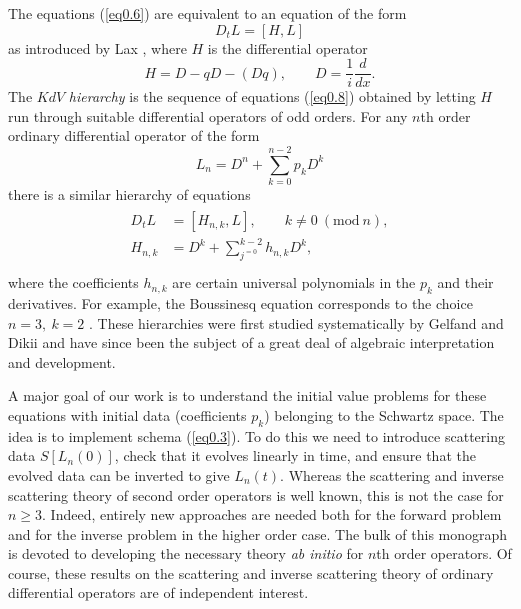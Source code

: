 \documentclass{surv-l}
\theoremstyle{plain}
\theoremstyle{definition}
\numberwithin{equation}{chapter}
\begin{document}
The equations (\ref{eq0.6}) are equivalent to an equation of the form
\begin{equation}\label{eq0.8}
D_{t}L=[H, L]
\end{equation}
as introduced by Lax \cite{Lx}, where $H$ is the differential operator
\begin{equation*}
H=D-qD-(Dq),\qquad D=\frac{1}{i}\frac{d}{dx}.
\end{equation*}
The $KdV$ \emph{hierarchy} is the sequence of equations (\ref{eq0.8}) obtained by letting $H$ run through suitable differential operators of odd orders. For any $n$th order ordinary differential operator of the form
\begin{equation*}
L_{n}=D^{n}+\sum_{k=0}^{n-2}p_{k}D^{k}
\end{equation*}
there is a similar hierarchy of equations
\begin{align}\label{eq0.9}
\begin{array}{ll}
D_{t}L &=  [H_{n,k},L],\qquad k\neq 0\ (\mathrm{mod}\ n),\\
H_{n,k} &=  D^{k}+\sum_{j^{=0}}^{k-2}h_{n,k}D^{k},\\\nonumber
\end{array}
\end{align}
where the coefficients $h_{n, k}$ are certain universal polynomials in the $p_{k}$ and their derivatives. For example, the Boussinesq equation corresponds to the choice $n = 3,\ k=2$ \cite{Za, McK, DTT}. These hierarchies were first studied systematically by Gelfand and Dikii \cite{GD} and have since been the subject of a great deal of algebraic interpretation and development.

A major goal of our work is to understand the initial value problems for these equations with initial data (coefficients $p_{k}$) belonging to the Schwartz space. The idea is to implement schema (\ref{eq0.3}). To do this we need to introduce scattering data $S[L_{n}(0)]$, check that it evolves linearly in time, and ensure that the evolved data can be inverted to give $L_{n}(t)$. Whereas the scattering and inverse scattering theory of second order operators is well known, this is not the case for $n\geq 3$. Indeed, entirely new approaches are needed both for the forward problem and for the inverse problem in the higher order case. The bulk of this monograph is devoted to developing the necessary theory \emph{ab initio} for $n$th order operators. Of course, these results on the scattering and inverse scattering theory of ordinary differential operators are of independent interest.
\end{document}
